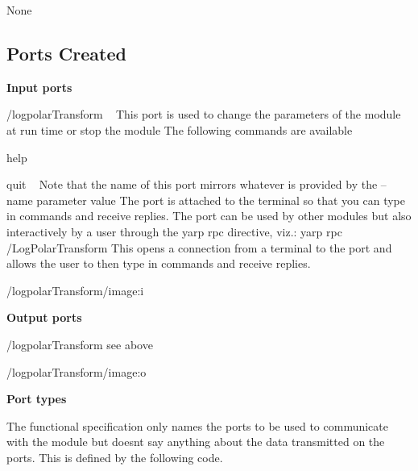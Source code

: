 \begin{DoxyItemize}
\item None
\end{DoxyItemize}\hypertarget{group__icub__logpolarTransform_portsc_sec}{}\subsection{Ports Created}\label{group__icub__logpolarTransform_portsc_sec}
{\bfseries Input ports}


\begin{DoxyItemize}
\item {\ttfamily /logpolar\+Transform} ~\newline
 This port is used to change the parameters of the module at run time or stop the module The following commands are available
\item help ~\newline

\item quit ~\newline
 Note that the name of this port mirrors whatever is provided by the {\ttfamily --name} {\ttfamily parameter} {\ttfamily value} The port is attached to the terminal so that you can type in commands and receive replies. The port can be used by other modules but also interactively by a user through the yarp rpc directive, viz.\+: yarp rpc /\+Log\+Polar\+Transform This opens a connection from a terminal to the port and allows the user to then type in commands and receive replies.
\item /logpolar\+Transform/image\+:i
\end{DoxyItemize}

{\bfseries Output ports}


\begin{DoxyItemize}
\item {\ttfamily /logpolar\+Transform} see above
\item {\ttfamily /logpolar\+Transform/image}\+:o
\end{DoxyItemize}

{\bfseries Port types }

The functional specification only names the ports to be used to communicate with the module but doesn\textquotesingle{}t say anything about the data transmitted on the ports. This is defined by the following code.


